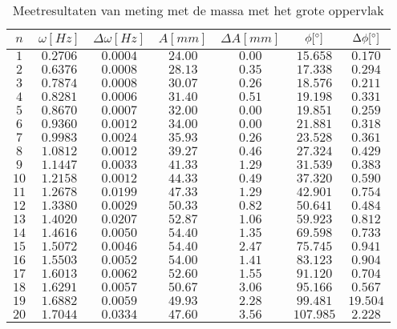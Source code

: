 \documentclass[12pt,a4]{article}
\begin{document}
\begin{table}[h]
\centering
\caption{Meetresultaten van meting met de massa met het grote oppervlak}
\begin{tabular}{c | c | c | c | c | c | c }
$ n $&$\omega [Hz] $&$ \Delta\omega [Hz] $&$ A [mm] $&$ \Delta A [mm] $&$ \phi [\degree] $&$ \Delta \phi [\degree] $\\
\hline
$ 1 $&$ 0.2706 $&$ 0.0004 $&$ 24.00 $&$ 0.00 $&$ 15.658 $&$ 0.170 $\\
$ 2 $&$ 0.6376 $&$ 0.0008 $&$ 28.13 $&$ 0.35 $&$ 17.338 $&$ 0.294 $\\
$ 3 $&$ 0.7874 $&$ 0.0008 $&$ 30.07 $&$ 0.26 $&$ 18.576 $&$ 0.211 $\\
$ 4 $&$ 0.8281 $&$ 0.0006 $&$ 31.40 $&$ 0.51 $&$ 19.198 $&$ 0.331 $\\
$ 5 $&$ 0.8670 $&$ 0.0007 $&$ 32.00 $&$ 0.00 $&$ 19.851 $&$ 0.259 $\\
$ 6 $&$ 0.9360 $&$ 0.0012 $&$ 34.00 $&$ 0.00 $&$ 21.881 $&$ 0.318 $\\
$ 7 $&$ 0.9983 $&$ 0.0024 $&$ 35.93 $&$ 0.26 $&$ 23.528 $&$ 0.361 $\\
$ 8 $&$ 1.0812 $&$ 0.0012 $&$ 39.27 $&$ 0.46 $&$ 27.324 $&$ 0.429 $\\
$ 9 $&$ 1.1447 $&$ 0.0033 $&$ 41.33 $&$ 1.29 $&$ 31.539 $&$ 0.383 $\\
$ 10 $&$ 1.2158 $&$ 0.0012 $&$ 44.33 $&$ 0.49 $&$ 37.320 $&$ 0.590 $\\
$ 11 $&$ 1.2678 $&$ 0.0199 $&$ 47.33 $&$ 1.29 $&$ 42.901 $&$ 0.754 $\\
$ 12 $&$ 1.3380 $&$ 0.0029 $&$ 50.33 $&$ 0.82 $&$ 50.641 $&$ 0.484 $\\
$ 13 $&$ 1.4020 $&$ 0.0207 $&$ 52.87 $&$ 1.06 $&$ 59.923 $&$ 0.812 $\\
$ 14 $&$ 1.4616 $&$ 0.0050 $&$ 54.40 $&$ 1.35 $&$ 69.598 $&$ 0.733 $\\
$ 15 $&$ 1.5072 $&$ 0.0046 $&$ 54.40 $&$ 2.47 $&$ 75.745 $&$ 0.941 $\\
$ 16 $&$ 1.5503 $&$ 0.0052 $&$ 54.00 $&$ 1.41 $&$ 83.123 $&$ 0.904 $\\
$ 17 $&$ 1.6013 $&$ 0.0062 $&$ 52.60 $&$ 1.55 $&$ 91.120 $&$ 0.704 $\\
$ 18 $&$ 1.6291 $&$ 0.0057 $&$ 50.67 $&$ 3.06 $&$ 95.166 $&$ 0.567 $\\
$ 19 $&$ 1.6882 $&$ 0.0059 $&$ 49.93 $&$ 2.28 $&$ 99.481 $&$ 19.504 $\\
$ 20 $&$ 1.7044 $&$ 0.0334 $&$ 47.60 $&$ 3.56 $&$ 107.985 $&$ 2.228 $\\

\end{tabular}
\end{table}
\end{document}
